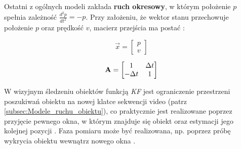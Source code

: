 Ostatni z ogólnych modeli zakłada \textbf{ruch okresowy}, w którym położenie $p$ spełnia zależność $\frac{d^2 p}{dt^2} = - p$. Przy założeniu, że wektor stanu przechowuje położenie $p$ oraz prędkość $v$, macierz przejścia ma postać \cite{Forsyth2012}:

\begin{equation}
\label{equ:Filtr_Kalmana_model_okresowy_wektor_stanu}
	\vec{x} = \begin{bmatrix}
		p \\
		v
	\end{bmatrix}
\end{equation}

\begin{equation}
\label{equ:Filtr_Kalmana_model_okresowy_macierz_przejscia}
	\mathbf{A} = \begin{bmatrix}
		1 & \Delta t \\
		-\Delta t & 1 
	\end{bmatrix}
\end{equation}

W wizyjnym śledzeniu obiektów funkcją \textit{KF} jest ograniczenie przestrzeni poszukiwań obiektu na nowej klatce sekwencji video (patrz \ref{subsec:Modele_ruchu_obiektu}), co praktycznie jest realizowane poprzez przyjęcie pewnego okna, w którym znajduje się obiekt oraz estymacji jego kolejnej pozycji \cite{Smeulders2010}. Faza pomiaru może być realizowana, np. poprzez próbę wykrycia obiektu wewnątrz nowego okna \cite{Forsyth2012}.